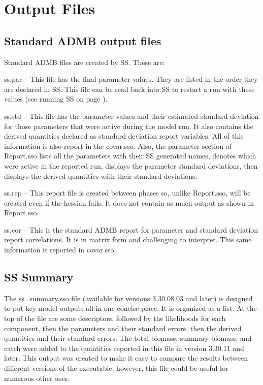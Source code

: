 \section{Output Files}

\subsection{Standard ADMB output files}
Standard ADMB files are created by SS. These are:

ss.par – This file has the final parameter values.  They are listed in the order they are declared in SS.  This file can be read back into SS to restart a run with these values (see running SS on page \pageref{sec:RunningSS}).

ss.std – This file has the parameter values and their estimated standard deviation for those parameters that were active during the model run.  It also contains the derived quantities declared as standard deviation report variables.  All of this information is also report in the covar.sso.  Also, the parameter section of Report.sso lists all the parameters with their SS generated names, denotes which were active in the reported run, displays the parameter standard deviations, then displays the derived quantities with their standard deviations.

ss.rep – This report file is created between phases so, unlike Report.sso, will be created even if the hessian fails. It does not contain as much output as shown in Report.sso.

ss.cor – This is the standard ADMB report for parameter and standard deviation report correlations. It is in matrix form and challenging to interpret.  This same information is reported in covar.sso.

\subsection{SS Summary}
The ss\_summary.sso file (available for versions 3.30.08.03 and later) is designed to put key model outputs all in one concise place.  It is organized as a list.  At the top of the file are some descriptors, followed by the likelihoods for each component, then the parameters and their standard errors, then the derived quantities and their standard errors.  The total biomass, summary biomass, and catch were added to the quantities reported in this file in version 3.30.11 and later. This output was created to make it easy to compare the results between different versions of the executable, however, this file could be useful for numerous other uses. 

